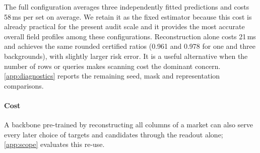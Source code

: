 The full configuration averages three independently fitted predictions and costs 58\,ms per set on average. We retain it as the fixed estimator because this cost is already practical for the present audit scale and it provides the most accurate overall field profiles among these configurations. Reconstruction alone costs 21\,ms and achieves the same rounded certified ratios (0.961 and 0.978 for one and three backgrounds), with slightly larger risk error. It is a useful alternative when the number of rows or queries makes scanning cost the dominant concern. \ref{app:diagnostics} reports the remaining seed, mask and representation comparisons.



\paragraph{Cost}
 A backbone pre-trained by reconstructing all columns of a market can also serve every later choice of
targets and candidates through the readout alone; \ref{app:scope} evaluates this re-use.

